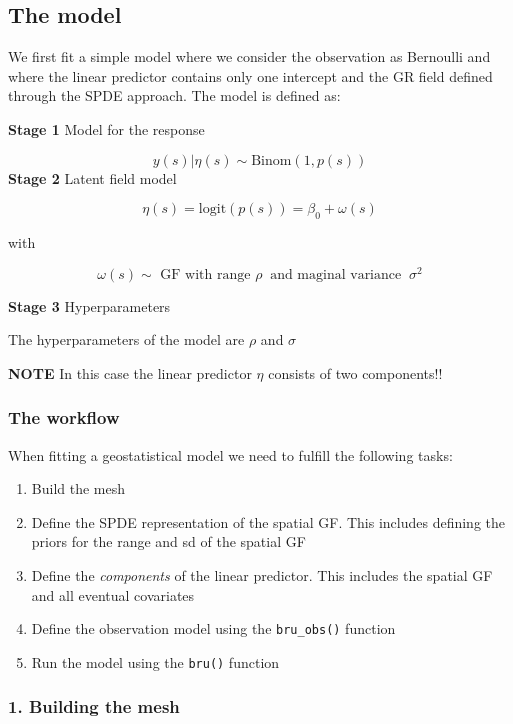 \documentclass[
  letterpaper,
  DIV=11,
  numbers=noendperiod]{scrartcl}
\begin{document}
\subsection{The model}\label{the-model-1}

We first fit a simple model where we consider the observation as
Bernoulli and where the linear predictor contains only one intercept and
the GR field defined through the SPDE approach. The model is defined as:

\textbf{Stage 1} Model for the response

\[
y(s)|\eta(s)\sim\text{Binom}(1, p(s))
\] \textbf{Stage 2} Latent field model

\[
\eta(s) = \text{logit}(p(s)) = \beta_0 + \omega(s)
\]

with

\[
\omega(s)\sim \text{  GF with range } \rho\  \text{ and maginal variance }\ \sigma^2
\]

\textbf{Stage 3} Hyperparameters

The hyperparameters of the model are \(\rho\) and \(\sigma\)

\textbf{NOTE} In this case the linear predictor \(\eta\) consists of two
components!!

\subsubsection{The workflow}\label{the-workflow}

When fitting a geostatistical model we need to fulfill the following
tasks:

\begin{enumerate}
\def\labelenumi{\arabic{enumi}.}
\item
  Build the mesh
\item
  Define the SPDE representation of the spatial GF. This includes
  defining the priors for the range and sd of the spatial GF
\item
  Define the \emph{components} of the linear predictor. This includes
  the spatial GF and all eventual covariates
\item
  Define the observation model using the \texttt{bru\_obs()} function
\item
  Run the model using the \texttt{bru()} function
\end{enumerate}

\subsubsection{1. Building the mesh}\label{building-the-mesh}
\end{document}
